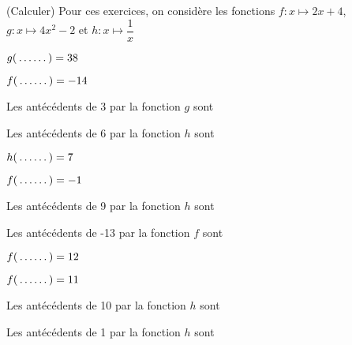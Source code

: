  (Calculer) Pour ces exercices, on considère les fonctions $f:x\mapsto 2x+4$, $g:x\mapsto 4x^2-2$ et $h:x\mapsto \dfrac{1}{x}$

\begin{multicols}{3}


$g(\fillin[1cm])=38$



$f(\fillin[1cm])=-14$



Les antécédents de 3 par la fonction $g$ sont \fillin[1cm]



Les antécédents de 6 par la fonction $h$ sont \fillin[1cm]



$h(\fillin[1cm])=7$



$f(\fillin[1cm])=-1$



Les antécédents de 9 par la fonction $h$ sont \fillin[1cm]



Les antécédents de -13 par la fonction $f$ sont \fillin[1cm]\columnbreak



$f(\fillin[1cm])=12$



$f(\fillin[1cm])=11$



Les antécédents de 10 par la fonction $h$ sont \fillin[1cm]



Les antécédents de 1 par la fonction $h$ sont \fillin[1cm]\columnbreak

\end{multicols}
